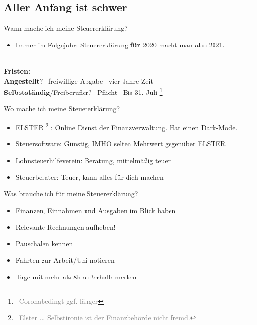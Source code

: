 \documentclass[draft]{beamer}
\newcommand{\n}{\hfill\\\vspace{0.25cm}}
\let\oldfootnote\footnote
\renewcommand{\footnote}[1]
{%
	\oldfootnote
	{
		\tiny
		\textcolor{gray}{\ #1}
	}%
}
\begin{document}
		\subsection{Aller Anfang ist schwer}
		
			\begin{frame}{Wann mache ich meine Steuererklärung?}
				\begin{itemize}
					\item Immer im Folgejahr: Steuererklärung \textbf{für} 2020 macht man also 2021.
				\end{itemize}\n
				\textbf{Fristen:}\\
				\textbf{Angestellt}? \textrightarrow\ freiwillige Abgabe \textrightarrow\ vier Jahre Zeit\\
				\textbf{Selbstständig}/Freiberufler? \textrightarrow\ Pflicht \textrightarrow\ Bis 31. Juli\footnote{Coronabedingt ggf. länger}
			\end{frame}

			\begin{frame}{Wo mache ich meine Steuererklärung?}
				\begin{itemize}
					\item ELSTER\footnote{Elster ... Selbstironie ist der Finanzbehörde nicht fremd.}: Online Dienst der Finanzverwaltung. Hat einen Dark-Mode.
					\item Steuersoftware: Günstig, IMHO selten Mehrwert gegenüber ELSTER
					\item Lohnsteuerhilfeverein: Beratung, mittelmäßig teuer
					\item Steuerberater: Teuer, kann alles für dich machen
				\end{itemize}
			\end{frame}
		
			\begin{frame}{Was brauche ich für meine Steuererklärung?}
				\begin{itemize}
					\item Finanzen, Einnahmen und Ausgaben im Blick haben
					\item Relevante Rechnungen aufheben!
					\item Pauschalen kennen
					\item Fahrten zur Arbeit/Uni notieren
					\item Tage mit mehr als 8h außerhalb merken
				\end{itemize}
			\end{frame}
		
\end{document}

